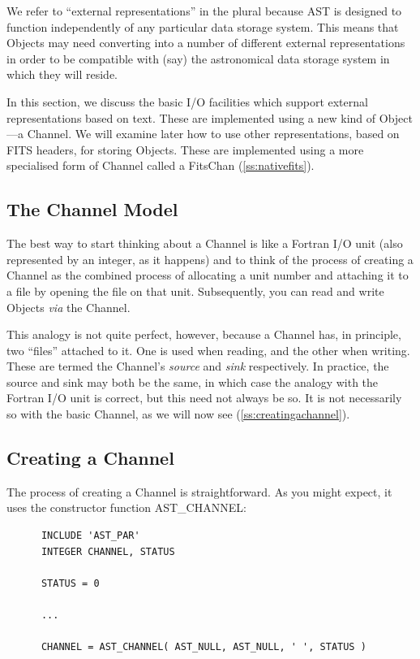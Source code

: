 \documentclass[twoside,11pt]{article}
\newcommand{\htmlref}[2]{#1}
\newcommand{\secref}[1]{\S\ref{#1}}
\renewcommand{\secref}[1]{\ref{#1}}
\begin{document}
We refer to ``external representations'' in the plural because AST is
designed to function independently of any particular data storage
system. This means that Objects may need converting into a number of
different external representations in order to be compatible with
(say) the astronomical data storage system in which they will reside.

In this section, we discuss the basic I/O facilities which support
external representations based on text. These are implemented using a
new kind of Object---a \htmlref{Channel}{Channel}. We will examine later how
to use other representations, based on FITS headers, for storing
Objects. These are implemented using a more specialised form of
Channel called a \htmlref{FitsChan}{FitsChan} (\secref{ss:nativefits}).

\subsection{The Channel Model}

The best way to start thinking about a \htmlref{Channel}{Channel} is like a Fortran I/O
unit (also represented by an integer, as it happens) and to think of
the process of creating a Channel as the combined process of
allocating a unit number and attaching it to a file by opening the
file on that unit. Subsequently, you can read and write Objects
{\em{via}} the Channel.

This analogy is not quite perfect, however, because a Channel has, in
principle, two ``files'' attached to it. One is used when reading, and
the other when writing. These are termed the Channel's {\em{source}}
and {\em{sink}} respectively. In practice, the source and sink may
both be the same, in which case the analogy with the Fortran I/O unit
is correct, but this need not always be so. It is not necessarily so
with the basic Channel, as we will now see
(\secref{ss:creatingachannel}).

\subsection{\label{ss:creatingachannel}Creating a Channel}

The process of creating a \htmlref{Channel}{Channel} is straightforward. As you
might expect, it uses the constructor function \htmlref{AST\_CHANNEL}{AST_CHANNEL}:

\small
\begin{verbatim}
      INCLUDE 'AST_PAR'
      INTEGER CHANNEL, STATUS

      STATUS = 0

      ...

      CHANNEL = AST_CHANNEL( AST_NULL, AST_NULL, ' ', STATUS )
\end{verbatim}
\normalsize
\end{document}
